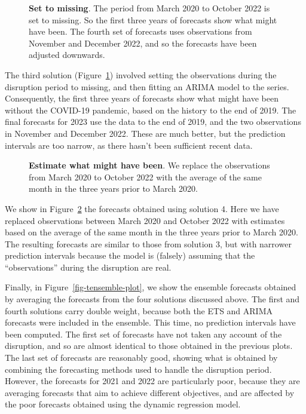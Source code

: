 \documentclass[11pt,a4paper,]{article}
\begin{document}
\begin{figure}[!b]


\caption{\label{fig-tsol3-plot}\textbf{Set to missing}. The period from
March 2020 to October 2022 is set to missing. So the first three years
of forecasts show what might have been. The fourth set of forecasts uses
observations from November and December 2022, and so the forecasts have
been adjusted downwards.}

\end{figure}%

The third solution (Figure~\ref{fig-tsol3-plot}) involved setting the
observations during the disruption period to missing, and then fitting
an ARIMA model to the series. Consequently, the first three years of
forecasts show what might have been without the COVID-19 pandemic, based
on the history to the end of 2019. The final forecasts for 2023 use the
data to the end of 2019, and the two observations in November and
December 2022. These are much better, but the prediction intervals are
too narrow, as there hasn't been sufficient recent data.

\begin{figure}[!b]


\caption{\label{fig-tsol4-plot}\textbf{Estimate what might have been}.
We replace the observations from March 2020 to October 2022 with the
average of the same month in the three years prior to March 2020.}

\end{figure}%

We show in Figure~\ref{fig-tsol4-plot} the forecasts obtained using
solution 4. Here we have replaced observations between March 2020 and
October 2022 with estimates based on the average of the same month in
the three years prior to March 2020. The resulting forecasts are similar
to those from solution 3, but with narrower prediction intervals because
the model is (falsely) assuming that the ``observations'' during the
disruption are real.

Finally, in Figure~\ref{fig-tensemble-plot}, we show the ensemble
forecasts obtained by averaging the forecasts from the four solutions
discussed above. The first and fourth solutions carry double weight,
because both the ETS and ARIMA forecasts were included in the ensemble.
This time, no prediction intervals have been computed. The first set of
forecasts have not taken any account of the disruption, and so are
almost identical to those obtained in the previous plots. The last set
of forecasts are reasonably good, showing what is obtained by combining
the forecasting methods used to handle the disruption period. However,
the forecasts for 2021 and 2022 are particularly poor, because they are
averaging forecasts that aim to achieve different objectives, and are
affected by the poor forecasts obtained using the dynamic regression
model.
\end{document}
